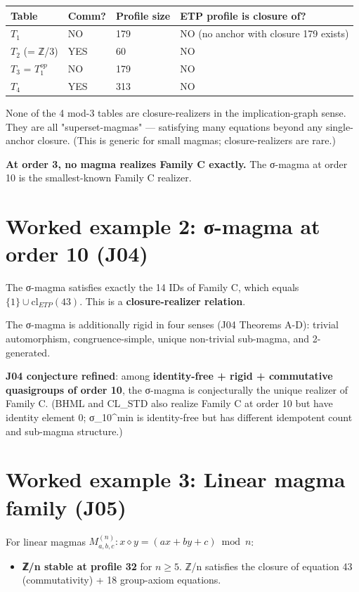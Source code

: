\documentclass[11pt,reqno]{amsart}
\theoremstyle{plain}
\theoremstyle{definition}
\begin{document}
\begin{center}
\begin{tabular}{llll}
\toprule
Table & Comm? & Profile size & ETP profile is closure of? \\
\midrule
$T_1$ & NO & 179 & NO (no anchor with closure 179 exists) \\
$T_2$ (= ℤ/3) & YES & 60 & NO \\
$T_3$ = $T_1^{op}$ & NO & 179 & NO \\
$T_4$ & YES & 313 & NO \\
\bottomrule
\end{tabular}
\end{center}

None of the 4 mod-3 tables are closure-realizers in the implication-graph sense. They are all "superset-magmas" --- satisfying many equations beyond any single-anchor closure. (This is generic for small magmas; closure-realizers are rare.)

\textbf{At order 3, no magma realizes Family C exactly.} The σ-magma at order 10 is the smallest-known Family C realizer.

\section{Worked example 2: σ-magma at order 10 (J04)}

The σ-magma satisfies exactly the 14 IDs of Family C, which equals $\{1\} \cup \mathrm{cl}_{ETP}(43)$. This is a \textbf{closure-realizer relation}.

The σ-magma is additionally rigid in four senses (J04 Theorems A-D): trivial automorphism, congruence-simple, unique non-trivial sub-magma, and 2-generated.

\textbf{J04 conjecture refined}: among \textbf{identity-free + rigid + commutative quasigroups of order 10}, the σ-magma is conjecturally the unique realizer of Family C. (BHML and CL_STD also realize Family C at order 10 but have identity element 0; σ_10^min is identity-free but has different idempotent count and sub-magma structure.)

\section{Worked example 3: Linear magma family (J05)}

For linear magmas $M_{a, b, c}^{(n)} : x \diamond y = (ax + by + c) \bmod n$:

\begin{itemize}
\item \textbf{ℤ/n stable at profile 32} for $n \geq 5$. ℤ/n satisfies the closure of equation 43 (commutativity) + 18 group-axiom equations.
\end{itemize}
\end{document}
